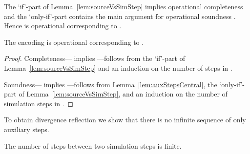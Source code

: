 \documentclass[]{eptcs}
\begin{document}
\noindent
The `if'-part of Lemma~\ref{lem:sourceVsSimStep} implies operational completeness \wrt  and the `only-if'-part contains the main argument for operational soundness \wrt . Hence  is operational corresponding \wrt to .

\begin{theorem}
	The encoding  is operational corresponding \wrt to .
	\label{thm:operationalCorrespondenceCentral}
\end{theorem}

\begin{proof}
	Completeness--- implies ---follows from the `if'-part of Lemma~\ref{lem:sourceVsSimStep} and an induction on the number of steps in .
	
	Soundness--- implies ---follows from Lemma~\ref{lem:auxStepsCentral}, the `only-if'-part of Lemma~\ref{lem:sourceVsSimStep}, and an induction on the number of simulation steps in .
\end{proof}

To obtain divergence reflection we show that there is no infinite sequence of only auxiliary steps.

\begin{lemma}
	The number of steps between two simulation steps is finite.
	\label{lem:numberStepsCentral}
\end{lemma}
\end{document}
